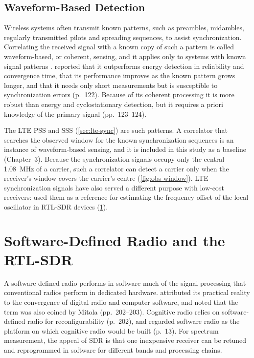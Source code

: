 \subsection{Waveform-Based Detection}
\label{sec:waveform}

Wireless systems often transmit known patterns, such as preambles, midambles, regularly transmitted pilots and spreading sequences, to assist synchronization. Correlating the received signal with a known copy of such a pattern is called waveform-based, or coherent, sensing, and it applies only to systems with known signal patterns \parencite[p.~122]{yucek2009}. \Textcite{yucek2009} reported that it outperforms energy detection in reliability and convergence time, that its performance improves as the known pattern grows longer, and that it needs only short measurements but is susceptible to synchronization errors (p.~122). Because of its coherent processing it is more robust than energy and cyclostationary detection, but it requires a priori knowledge of the primary signal (pp.~123--124).

The LTE PSS and SSS (\cref{sec:lte-sync}) are such patterns. A correlator that searches the observed window for the known synchronization sequences is an instance of waveform-based sensing, and it is included in this study as a baseline (Chapter~3). Because the synchronization signals occupy only the central \qty{1.08}{\mega\hertz} of a carrier, such a correlator can detect a carrier only when the receiver's window covers the carrier's centre (\cref{fig:obs-window}). LTE synchronization signals have also served a different purpose with low-cost receivers: \textcite{calvopalomino2017} used them as a reference for estimating the frequency offset of the local oscillator in RTL-SDR devices (\cref{sec:sdr}).

\section{Software-Defined Radio and the RTL-SDR}
\label{sec:sdr}

A software-defined radio performs in software much of the signal processing that conventional radios perform in dedicated hardware. \Textcite{haykin2005} attributed its practical reality to the convergence of digital radio and computer software, and noted that the term was also coined by Mitola (pp.~202--203). Cognitive radio relies on software-defined radio for reconfigurability (p.~202), and \textcite{mitola1999} regarded software radio as the platform on which cognitive radio would be built (p.~13). For spectrum measurement, the appeal of SDR is that one inexpensive receiver can be retuned and reprogrammed in software for different bands and processing chains.


